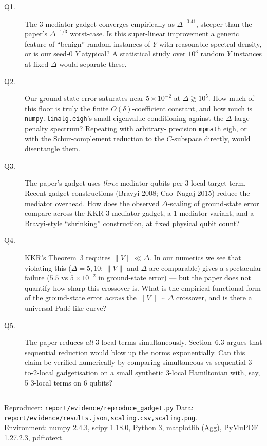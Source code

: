 \documentclass[11pt]{article}
\begin{document}
\begin{description}
\item[Q1.] The 3-mediator gadget converges empirically as
  $\Delta^{-0.41}$, steeper than the paper's $\Delta^{-1/3}$
  worst-case.  Is this super-linear improvement a generic feature of
  ``benign'' random instances of $Y$ with reasonable spectral density,
  or is our seed-0 $Y$ atypical?  A statistical study over $10^{3}$
  random $Y$ instances at fixed $\Delta$ would separate these.
\item[Q2.] Our ground-state error saturates near $5\times 10^{-2}$
  at $\Delta \gtrsim 10^{5}$.  How much of this floor is truly the
  finite $O(\delta)$-coefficient constant, and how much is
  \texttt{numpy.linalg.eigh}'s small-eigenvalue conditioning against
  the $\Delta$-large penalty spectrum?  Repeating with arbitrary-
  precision \texttt{mpmath} eigh, or with the Schur-complement
  reduction to the $C$-subspace directly, would disentangle them.
\item[Q3.] The paper's gadget uses \emph{three} mediator qubits per
  3-local target term.  Recent gadget constructions (Bravyi 2008;
  Cao--Nagaj 2015) reduce the mediator overhead.  How does the observed
  $\Delta$-scaling of ground-state error compare across the KKR
  3-mediator gadget, a 1-mediator variant, and a Bravyi-style
  ``shrinking'' construction, at fixed physical qubit count?
\item[Q4.] KKR's Theorem~3 requires $\|V\| \ll \Delta$.  In our
  numerics we see that violating this ($\Delta = 5,10$: $\|V\|$ and
  $\Delta$ are comparable) gives a spectacular failure ($5.5$ vs
  $5\times 10^{-2}$ in ground-state error) --- but the paper does not
  quantify how sharp this crossover is.  What is the empirical
  functional form of the ground-state error \emph{across} the
  $\|V\| \sim \Delta$ crossover, and is there a universal Padé-like
  curve?
\item[Q5.] The paper reduces \emph{all} 3-local terms simultaneously.
  Section~6.3 argues that sequential reduction would blow up the norms
  exponentially.  Can this claim be verified numerically by comparing
  simultaneous vs sequential 3-to-2-local gadgetisation on a small
  synthetic 3-local Hamiltonian with, say, 5 3-local terms on 6 qubits?
\end{description}

\bigskip
\hrule
\smallskip
Reproducer: \texttt{report/evidence/reproduce\_gadget.py}\quad
Data: \texttt{report/evidence/results.json,scaling.csv,scaling.png}.\\
Environment: numpy 2.4.3, scipy 1.18.0, Python 3, matplotlib (Agg),
PyMuPDF 1.27.2.3, pdftotext.
\end{document}
